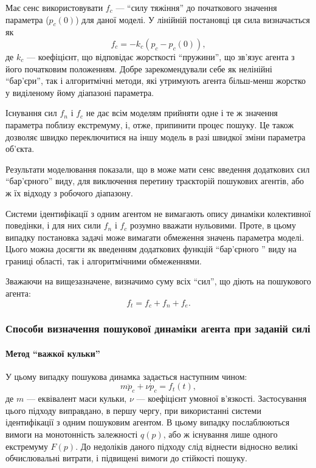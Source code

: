 Має сенс використовувати $f_c$ --- ``силу тяжіння'' до початкового значення параметра
($p_{c}(0)$) для даної моделі. У лінійній постановці ця сила визначається як
%
\begin{equation}
  f_c = -k_c (p_c - p_{c}(0)) ,
  \label{atu:eq:f_c}
\end{equation}
%
де $k_c$ --- коефіцієнт, що відповідає жорсткості ``пружини'',
що зв'язує агента з його початковим положенням.
Добре зарекомендували себе як нелінійні ``бар'єри'',
так і алгоритмічні методи, які утримують агента
більш-менш жорстко у виділеному йому діапазоні параметра.

Існування сил
$f_n$ і $f_c$
не дає всім моделям прийняти одне і те ж значення параметра
поблизу екстремуму, і, отже, припинити процес пошуку. Це також
дозволяє швидко переключитися на іншу модель в разі швидкої
зміни параметра об'єкта.

Результати моделювання показали, що в може мати
сенс введення додаткових сил ``бар'єрного'' виду, для виключення
перетину траєкторій пошукових агентів, або ж їх відходу з
робочого діапазону.

Системи ідентифікації з одним агентом не вимагають опису
динаміки колективної поведінки, і для них сили
$ f_n $ і
$ f_c $ розумно вважати нульовими. Проте, в цьому випадку постановка
задачі може вимагати обмеження значень параметра моделі. Цього
можна досягти як введенням додаткових функцій ``бар'єрного ''
виду на границі області, так і алгоритмічними обмеженнями.

Зважаючи на вищезазначене, визначимо суму всіх ``сил'',
що діють на пошукового агента:
\begin{equation}
  f_t = f_c + f_n + f_e .
  \label{atu:eq:f_t}
\end{equation}






\subsubsection{Способи визначення пошукової динаміки агента при заданій силі}  %

\paragraph{Метод ``важкої кульки''}

У цьому випадку пошукова динамка задається наступним чином:
%
\begin{equation}
  m \ddot{p}_c + \nu \dot{p}_c = f_t(t),
  \label{atu:eq:heavy_ball}
\end{equation}
%
де $m$ --- еквівалент маси кульки, $\nu$ --- коефіцієнт умовної в'язкості.
%
Застосування цього підходу виправдано, в першу чергу, при
використанні системи ідентифікації з одним пошуковим агентом. В
цьому випадку послаблюються вимоги на монотонність залежності
$q(p)$, або ж існування лише одного екстремуму
$F(p)$. До недоліків даного підходу слід віднести відносно великі
обчислювальні витрати, і підвищені вимоги до стійкості пошуку.


